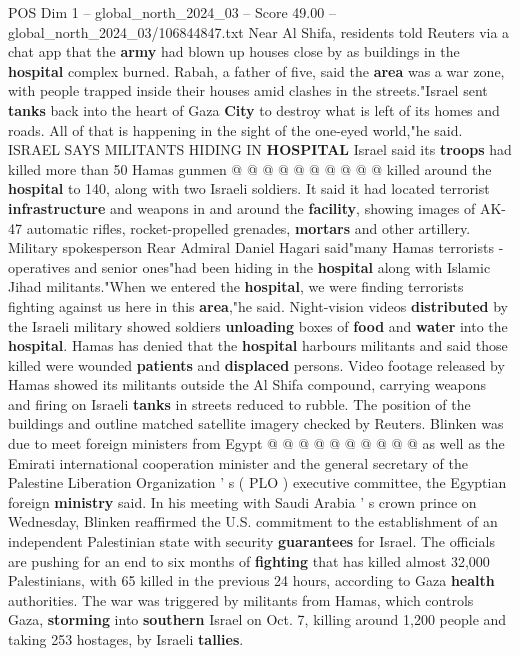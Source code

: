 \begin{textsample}{POS Dim 1 – global\_north\_2024\_03 – Score 49.00 – global\_north\_2024\_03/106844847.txt}
Near Al Shifa, residents told Reuters via a chat app that the \textbf{army} had blown up houses close by as buildings in the \textbf{hospital} complex burned.
Rabah, a father of five, said the \textbf{area} was a war zone, with people trapped inside their houses amid clashes in the streets."Israel sent \textbf{tanks} back into the heart of Gaza \textbf{City} to destroy what is left of its homes and roads.
All of that is happening in the sight of the one-eyed world,"he said.
ISRAEL SAYS MILITANTS HIDING IN \textbf{HOSPITAL} Israel said its \textbf{troops} had killed more than 50 Hamas gunmen @ @ @ @ @ @ @ @ @ @ killed around the \textbf{hospital} to 140, along with two Israeli soldiers.
It said it had located terrorist \textbf{infrastructure} and weapons in and around the \textbf{facility}, showing images of AK-47 automatic rifles, rocket-propelled grenades, \textbf{mortars} and other artillery.
Military spokesperson Rear Admiral Daniel Hagari said"many Hamas terrorists - operatives and senior ones"had been hiding in the \textbf{hospital} along with Islamic Jihad militants."When we entered the \textbf{hospital}, we were finding terrorists fighting against us here in this \textbf{area},"he said.
Night-vision videos \textbf{distributed} by the Israeli military showed soldiers \textbf{unloading} boxes of \textbf{food} and \textbf{water} into the \textbf{hospital}.
Hamas has denied that the \textbf{hospital} harbours militants and said those killed were wounded \textbf{patients} and \textbf{displaced} persons.
Video footage released by Hamas showed its militants outside the Al Shifa compound, carrying weapons and firing on Israeli \textbf{tanks} in streets reduced to rubble.
The position of the buildings and outline matched satellite imagery checked by Reuters.
Blinken was due to meet foreign ministers from Egypt @ @ @ @ @ @ @ @ @ @ as well as the Emirati international cooperation minister and the general secretary of the Palestine Liberation Organization ' s ( PLO ) executive committee, the Egyptian foreign \textbf{ministry} said.
In his meeting with Saudi Arabia ' s crown prince on Wednesday, Blinken reaffirmed the U.S. commitment to the establishment of an independent Palestinian state with security \textbf{guarantees} for Israel.
The officials are pushing for an end to six months of \textbf{fighting} that has killed almost 32,000 Palestinians, with 65 killed in the previous 24 hours, according to Gaza \textbf{health} authorities.
The war was triggered by militants from Hamas, which controls Gaza, \textbf{storming} into \textbf{southern} Israel on Oct. 7, killing around 1,200 people and taking 253 hostages, by Israeli \textbf{tallies}.

\end{textsample}
